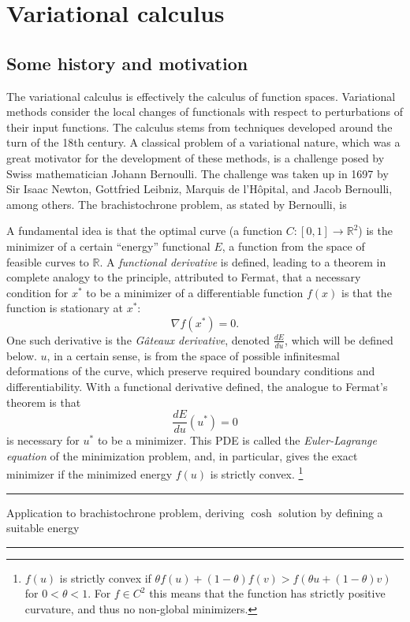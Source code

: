\documentclass{article}
\newcommand{\todo}[1]{\vskip 0.1in \hrule \vskip 0.03in {#1} \vskip 0.03in \hrule \vskip 0.1in}
\begin{document}
\section{Variational calculus}
\subsection{Some history and motivation}

The variational calculus is effectively the calculus of function spaces. Variational methods consider the local changes of functionals with respect to perturbations
of their input functions. The calculus stems from techniques developed around the turn of the 18th century. A classical problem of a variational nature,
which was a great motivator for the development of these methods, is a challenge posed by Swiss mathematician Johann Bernoulli.
The challenge was taken up in 1697 by Sir Isaac Newton, Gottfried Leibniz, Marquis de l'H\^opital, and Jacob Bernoulli, among others. The
brachistochrone problem, as stated by Bernoulli, is \cite{johann_bernoulli}


A fundamental idea is that the optimal curve (a function $C:[0,1]\rightarrow \mathbb{R}^2$) is the minimizer of a certain ``energy'' functional $E$,
a function from the space of feasible curves to $\mathbb{R}$. A \textit{functional derivative} is defined, leading to a theorem in complete analogy to the principle, attributed to Fermat, that a necessary condition for $x^*$ to be a minimizer of a differentiable function $f(x)$ is that the function is stationary at $x^*$:
    $$\nabla f(x^*) = 0.$$
One such derivative is the \textit{G\^ateaux derivative}, denoted
$\frac{dE}{du}$, which will be defined below.
$u$, in a certain sense, is from the space of possible infinitesmal deformations of the curve, which preserve required boundary conditions and differentiability. With a functional derivative defined, the analogue to Fermat's theorem is that
    $$\frac{dE}{du}(u^*) = 0$$
is necessary for $u^*$ to be a minimizer. This PDE is called the \textit{Euler-Lagrange equation} of the minimization problem, and, in particular, gives the
exact minimizer if the minimized energy $f(u)$ is strictly convex.
\footnote{
$f(u)$ is strictly convex if $\theta f(u) + (1-\theta)f(v) > f(\theta u + (1 - \theta) v)$ for $0 < \theta < 1$. For $f \in C^2$ this means that the function has strictly positive curvature, and thus no non-global minimizers.
}
\todo{Application to brachistochrone problem, deriving $\cosh$ solution by defining a suitable energy}
\end{document}
